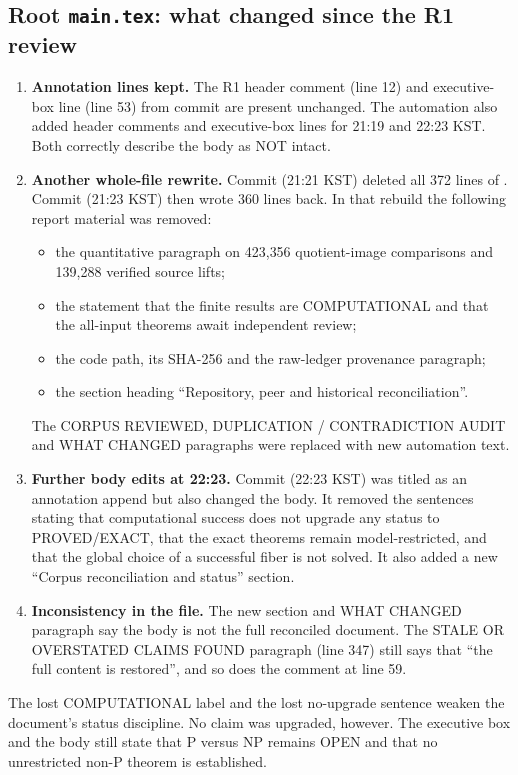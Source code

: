 \documentclass[11pt]{article}
\begin{document}
\subsection{Root \texttt{main.tex}: what changed since the R1 review}
\begin{enumerate}
\item \textbf{Annotation lines kept.} The R1 header comment (line 12) and
executive-box line (line 53) from commit  are present
unchanged. The automation also added header comments and executive-box
lines for 21:19 and 22:23 KST. Both correctly describe the body as NOT
intact.
\item \textbf{Another whole-file rewrite.} Commit 
(21:21 KST) deleted all 372 lines of . Commit
 (21:23 KST) then wrote 360 lines back. In that rebuild
the following report material was removed:
\begin{itemize}
\item the quantitative paragraph on 423{,}356 quotient-image comparisons
and 139{,}288 verified source lifts;
\item the statement that the finite results are COMPUTATIONAL and that
the all-input theorems await independent review;
\item the code path, its SHA-256 and the raw-ledger provenance paragraph;
\item the section heading ``Repository, peer and historical
reconciliation''.
\end{itemize}
The CORPUS REVIEWED, DUPLICATION / CONTRADICTION AUDIT and WHAT CHANGED
paragraphs were replaced with new automation text.
\item \textbf{Further body edits at 22:23.} Commit 
(22:23 KST) was titled as an annotation append but also changed the
body. It removed the sentences stating that computational success does
not upgrade any status to PROVED/EXACT, that the exact theorems remain
model-restricted, and that the global choice of a successful fiber is
not solved. It also added a new ``Corpus reconciliation and status''
section.
\item \textbf{Inconsistency in the file.} The new section and WHAT
CHANGED paragraph say the body is not the full reconciled document. The
STALE OR OVERSTATED CLAIMS FOUND paragraph (line 347) still says that
``the full content is restored'', and so does the comment at line 59.
\end{enumerate}
The lost COMPUTATIONAL label and the lost no-upgrade sentence weaken the
document's status discipline. No claim was upgraded, however. The
executive box and the body still state that P versus NP remains OPEN and
that no unrestricted non-P theorem is established.
\end{document}
